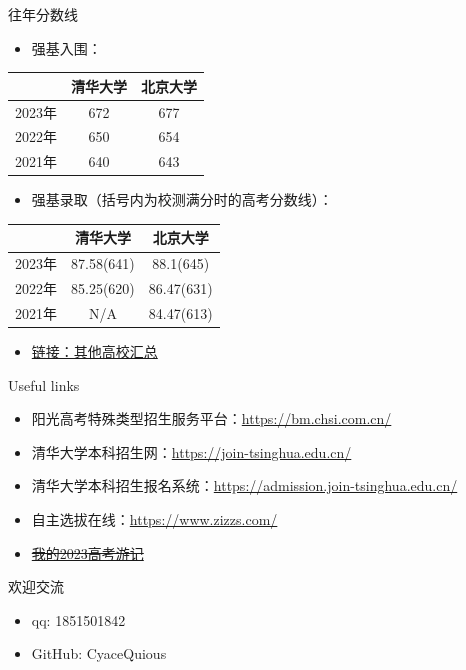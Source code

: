 \documentclass{beamer}
\begin{document}
\begin{frame}{往年分数线}
    \pause
    \begin{itemize}
        \item 强基入围：
    \end{itemize}
    \begin{table}[h!]
        \centering
        \begin{tabular}{| c | c | c |}
            \hline 
            & 清华大学 & 北京大学 \\
            \hline 
            2023年 & 672 & 677 \\
            \hline 
            2022年 & 650 & 654 \\
            \hline 
            2021年 & 640 & 643 \\
            \hline 
        \end{tabular}
        \label{tab:cutoff1}
    \end{table}
    \pause
    \begin{itemize}
        \item 强基录取（括号内为校测满分时的高考分数线）：
    \end{itemize}
    \begin{table}[h!]
        \centering
        \begin{tabular}{| c | c | c |}
            \hline 
            & 清华大学 & 北京大学 \\
            \hline 
            2023年 & 87.58(641) & 88.1(645) \\
            \hline 
            2022年 & 85.25(620) & 86.47(631) \\
            \hline 
            2021年 & N/A & 84.47(613) \\
            \hline 
        \end{tabular}
        \label{tab:cutoff2}
    \end{table}
    \pause
    \begin{itemize}
        \item \href{https://www.zizzs.com/c/202111/65665.html}{链接：其他高校汇总}
    \end{itemize}
\end{frame}

\begin{frame}{Useful links}
    \pause
    \begin{itemize}
        \item 阳光高考特殊类型招生服务平台：\url{https://bm.chsi.com.cn/}
        \pause
        \item 清华大学本科招生网：\url{https://join-tsinghua.edu.cn/}
        \pause
        \item 清华大学本科招生报名系统：\url{https://admission.join-tsinghua.edu.cn/}
        \pause
        \item 自主选拔在线：\url{https://www.zizzs.com/}
        \pause
        \item \href{https://www.luogu.com.cn/blog/caeious/post-2023-gao-kao-you-ji}{\sout{我的2023高考游记}}
    \end{itemize}
\end{frame}

\begin{frame}{欢迎交流}
    \begin{itemize}
        \item qq: 1851501842
        \item GitHub: CyaceQuious
    \end{itemize}
\end{frame}
\end{document}
